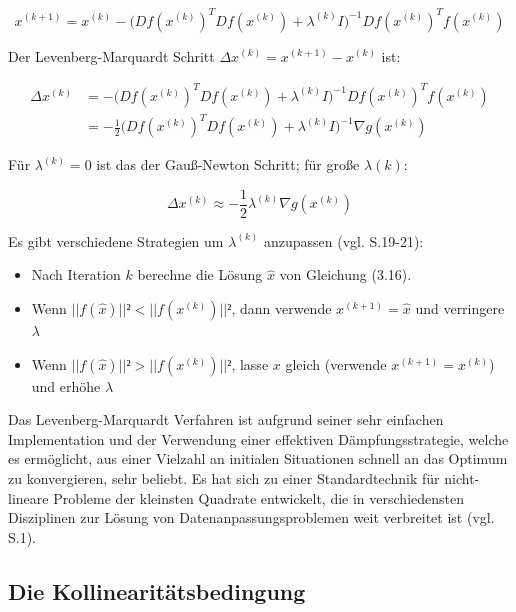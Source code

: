 \begin{equation}
x^{(k+1)} = x^{(k)} -\Big(Df(x^{(k)})^TDf(x^{(k)})+\lambda^{(k)}I\Big)^{-1} Df(x^{(k)})^T f(x^{(k)})
\end{equation}

Der Levenberg-Marquardt Schritt $\Delta x^{(k)} = x^{(k+1)} - x^{(k)}$ ist:

\begin{equation}
\begin{aligned}
\Delta x^{(k)} &= -\Big(Df(x^{(k)})^TDf(x^{(k)})+\lambda^{(k)}I\Big)^{-1} Df(x^{(k)})^T f(x^{(k)})\\ &= -\frac{1}{2} \Big(Df(x^{(k)})^TDf(x^{(k)})+\lambda^{(k)}I\Big)^{-1} \nabla g(x^{(k)})
\end{aligned}
\end{equation}

Für $\lambda^{(k)}=0$ ist das der Gauß-Newton Schritt; für große $\lambda{(k)}$:

\begin{equation}
\Delta x^{(k)} \approx -\frac{1}{2}\lambda^{(k)}\nabla g(x^{(k)})
\end{equation}

Es gibt verschiedene Strategien um $\lambda^{(k)}$ anzupassen (vgl. \cite{nonlinear_1} S.19-21):

\begin{itemize}
\item Nach Iteration $k$ berechne die Lösung $\hat{x}$ von Gleichung (3.16).
\item Wenn $||f(\hat{x})||²<||f(x^{(k)})||²$, dann verwende $x^{(k+1)} = \hat{x}$ und verringere $\lambda$
\item Wenn $||f(\hat{x})||²>||f(x^{(k)})||²$, lasse $x$ gleich (verwende $x^{(k+1)} = x^{(k)}$) und erhöhe $\lambda$
\end{itemize}

Das Levenberg-Marquardt Verfahren ist aufgrund seiner sehr einfachen Implementation und der Verwendung einer effektiven Dämpfungsstrategie, welche es ermöglicht, aus einer Vielzahl an initialen Situationen schnell an das Optimum zu konvergieren, sehr beliebt. Es hat sich zu einer Standardtechnik für nicht-lineare Probleme der kleinsten Quadrate entwickelt, die in verschiedensten Disziplinen zur Lösung von Datenanpassungsproblemen weit verbreitet ist (vgl. \cite{lev_efficient} S.1).

\subsection{Die Kollinearitätsbedingung}

